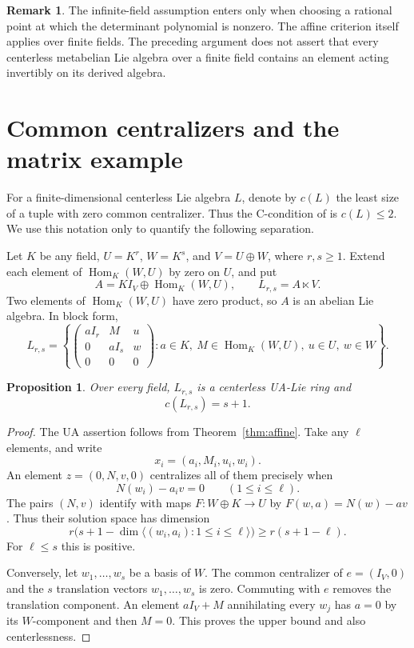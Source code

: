 \documentclass[11pt]{article}
\newtheorem{proposition}[theorem]{Proposition}
\theoremstyle{definition}
\newtheorem{remark}[theorem]{Remark}
\DeclareMathOperator{\Hom}{Hom}
\begin{document}
\begin{remark}
The infinite-field assumption enters only when choosing a rational point at which the determinant polynomial is nonzero. The affine criterion itself applies over finite fields. The preceding argument does not assert that every centerless metabelian Lie algebra over a finite field contains an element acting invertibly on its derived algebra.
\end{remark}

\section{Common centralizers and the matrix example}
For a finite-dimensional centerless Lie algebra $L$, denote by $c(L)$ the least size of a tuple with zero common centralizer. Thus the C-condition of \cite{Arz} is $c(L)\le2$. We use this notation only to quantify the following separation.

Let $K$ be any field, $U=K^r$, $W=K^s$, and $V=U\oplus W$, where $r,s\ge1$. Extend each element of $\Hom_K(W,U)$ by zero on $U$, and put
\[
 A=K I_V\oplus\Hom_K(W,U),\qquad L_{r,s}=A\ltimes V.
\]
Two elements of $\Hom_K(W,U)$ have zero product, so $A$ is an abelian Lie algebra. In block form,
\begin{equation}\label{eq:block}
 L_{r,s}=\left\{
 \begin{pmatrix}
  aI_r&M&u\\
  0&aI_s&w\\
  0&0&0
 \end{pmatrix}
 :a\in K,\ M\in\Hom_K(W,U),\ u\in U,\ w\in W
 \right\}.
\end{equation}

\begin{proposition}\label{prop:centralizers}
Over every field, $L_{r,s}$ is a centerless UA-Lie ring and
\[
 c(L_{r,s})=s+1.
\]
\end{proposition}
\begin{proof}
The UA assertion follows from Theorem~\ref{thm:affine}. Take any $\ell$ elements, and write
\[x_i=(a_i,M_i,u_i,w_i).\]
An element $z=(0,N,v,0)$ centralizes all of them precisely when
\[
 N(w_i)-a_iv=0\qquad(1\le i\le\ell).
\]
The pairs $(N,v)$ identify with maps $F:W\oplus K\to U$ by $F(w,a)=N(w)-av$. Thus their solution space has dimension
\[
 r\bigl(s+1-\dim\langle(w_i,a_i):1\le i\le\ell\rangle\bigr)
 \ge r(s+1-\ell).
\]
For $\ell\le s$ this is positive.

Conversely, let $w_1,\ldots,w_s$ be a basis of $W$. The common centralizer of $e=(I_V,0)$ and the $s$ translation vectors $w_1,\ldots,w_s$ is zero. Commuting with $e$ removes the translation component. An element $aI_V+M$ annihilating every $w_j$ has $a=0$ by its $W$-component and then $M=0$. This proves the upper bound and also centerlessness.
\end{proof}
\end{document}
